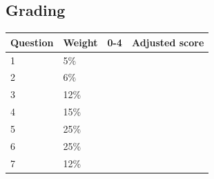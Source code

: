 \documentclass[a4paper,12pt]{book}
\begin{document}
    \subsection*{Grading}
            
    \begin{center}
        
        \begin{tabular}{ | l | l | l | l | }
            \hline
            \textbf{ Question } & \textbf{ Weight } & \textbf{ 0-4 } & \textbf{ Adjusted score }
            \\ \hline
            
            1 & 5\% & &    \\ \hline
            
            2 & 6\% & &    \\ \hline
            
            3 & 12\% & &    \\ \hline
            
            4 & 15\% & &    \\ \hline
            
            5 & 25\% & &    \\ \hline
            
            6 & 25\% & &    \\ \hline
            
            7 & 12\% & &    \\ \hline
            
            
            
        \end{tabular}
    \end{center}
\end{document}
